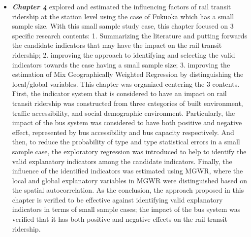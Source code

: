 \begin{itemize}
	\item \emph{\textbf{Chapter 4}} explored and estimated the influencing factors of rail transit ridership at the station level using the case of Fukuoka which has a small sample size. With this small sample study case, this chapter focused on 3 specific research contents: 1. Summarizing the literature and putting forwards the candidate indicators that may have the impact on the rail transit ridership; 2. improving the approach to identifying and selecting the valid indicators towards the case having a small sample size; 3. improving the estimation of Mix Geographically Weighted Regression by distinguishing the local/global variables.	This chapter was organized centering the 3 contents. First, the indicator system that is considered to have an impact on rail transit ridership was constructed from three categories of built environment, traffic accessibility, and social demographic environment. Particularly, the impact of the bus system was considered to have both positive and negative effect, represented by bus accessibility and bus capacity respectively. And then, to reduce the probability of type \uppercase\expandafter{} and type \uppercase\expandafter{} statistical errors in a small sample case, the exploratory regression was introduced to help to identify the valid explanatory indicators among the candidate indicators. Finally, the influence of the identified indicators was estimated using MGWR, where the local and global explanatory variables in MGWR were distinguished based on the spatial autocorrelation. As the conclusion, the approach proposed in this chapter is verified to be effective against identifying valid explanatory indicators in terms of small sample cases; the impact of the bus system was verified that it has both positive and negative effects on the rail transit ridership.
	

\end{itemize}
